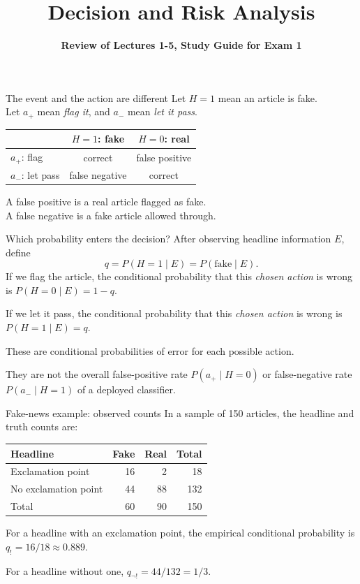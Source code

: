 \documentclass[aspectratio=43,10pt]{beamer}
\title{Decision and Risk Analysis}
\subtitle{\textbf{Review of Lectures 1-5, Study Guide for Exam 1}}
\author{}
\date{
\color{aggiemaroon}{
DAEN 427 / ISEN 427 / ISEN 627 - Fall 2026\\
\textbf{Alexander Abuabara}
}
}
\begin{document}
\begin{frame}
  \titlepage
\end{frame}

\begin{frame}{The event and the action are different}
Let $H=1$ mean an article is fake. \\
Let $a_+$ mean \emph{flag it}, and $a_-$ mean \emph{let it pass}.

\medskip
\begin{center}
\begin{tabular}{lcc}
\toprule
 & $H=1$: fake & $H=0$: real \\
\midrule
$a_+$: flag & correct & false positive \\
$a_-$: let pass & false negative & correct \\
\bottomrule
\end{tabular}
\end{center}

\medskip
A false positive is a real article flagged as fake. \\
A false negative is a fake article allowed through.
\end{frame}

\begin{frame}{Which probability enters the decision?}
After observing headline information $E$, define
\[
q=P(H=1\mid E)=P(\text{fake}\mid E).
\]
If we flag the article, the conditional probability that this \emph{chosen
action} is wrong is $P(H=0\mid E)=1-q$.

\medskip
If we let it pass, the conditional probability that this \emph{chosen
action} is wrong is $P(H=1\mid E)=q$.

\medskip
These are conditional probabilities of error for each possible action.

\medskip
They are not the overall false-positive rate $P(a_+\mid H=0)$ or
false-negative rate $P(a_-\mid H=1)$ of a deployed classifier.
\end{frame}

\begin{frame}{Fake-news example: observed counts}
In a sample of 150 articles, the headline and truth counts are:

\medskip
\begin{center}
\begin{tabular}{lrrr}
\toprule
Headline & Fake & Real & Total \\
\midrule
Exclamation point & 16 & 2 & 18 \\
No exclamation point & 44 & 88 & 132 \\
\midrule
Total & 60 & 90 & 150 \\
\bottomrule
\end{tabular}
\end{center}

\medskip
For a headline with an exclamation point, the empirical conditional
probability is $q_!=16/18\approx0.889$.

\medskip
For a headline without one, $q_{\neg !}=44/132=1/3$.
\end{frame}
\end{document}
